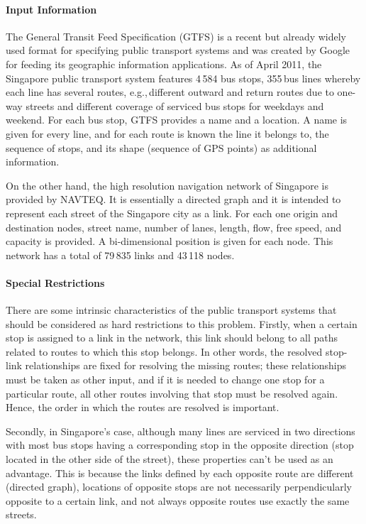 \paragraph{Input Information}

The General Transit Feed Specification (GTFS) is a recent but already widely used format for specifying public transport systems and was created by Google for feeding its geographic information applications. As of April 2011, the Singapore public transport system features 4\,584 bus stops, 355\,bus lines whereby each line has several routes, e.g.,\,different outward and return routes due to one-way streets and different coverage of serviced bus stops for weekdays and weekend. For each bus stop, GTFS provides a name and a location. A name is given for every line, and for each route is known the line it belongs to, the sequence of stops, and its shape (sequence of GPS points) as additional information.

On the other hand, the high resolution navigation network of Singapore is provided by NAVTEQ. It is essentially a directed graph and it is intended to represent each street of the Singapore city as a link. For each one origin and destination nodes, street name, number of lanes, length, flow, free speed, and capacity is provided. A bi-dimensional position is given for each node. This network has a total of 79\,835 links and 43\,118 nodes.

\paragraph{Special Restrictions}

There are some intrinsic characteristics of the public transport systems that should be considered as hard restrictions to this problem. Firstly, when a certain stop is assigned to a link in the network, this link should belong to all paths related to routes to which this stop belongs. In other words, the resolved stop-link relationships are fixed for resolving the missing routes; these relationships must be taken as other input, and if it is needed to change one stop for a particular route, all other routes involving that stop must be resolved again. Hence, the order in which the routes are resolved is important.

Secondly, in Singapore's case, although many lines are serviced in two directions with most bus stops having a corresponding stop in the opposite direction (stop located in the other side of the street), these properties can't be used as an advantage. This is because the links defined by each opposite route are different (directed graph), locations of opposite stops are not necessarily perpendicularly opposite to a certain link, and not always opposite routes use exactly the same streets.

